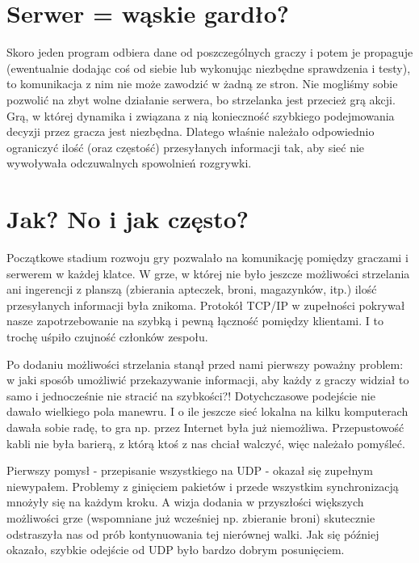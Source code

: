 \documentclass[licencjacka]{pracamgr}
\begin{document}
\section{Serwer = wąskie gardło?}

Skoro jeden program odbiera dane od poszczególnych graczy i potem je propaguje (ewentualnie dodając coś od siebie lub wykonując niezbędne sprawdzenia i testy), to komunikacja z nim nie może zawodzić w żadną ze stron. Nie mogliśmy sobie pozwolić na zbyt wolne działanie serwera, bo strzelanka jest przecież grą akcji. Grą, w której dynamika i związana z nią konieczność szybkiego podejmowania decyzji przez gracza jest niezbędna. Dlatego właśnie należało odpowiednio ograniczyć ilość (oraz częstość) przesyłanych informacji tak, aby sieć nie wywoływała odczuwalnych spowolnień rozgrywki.

\section{Jak? No i jak często?}

Początkowe stadium rozwoju gry pozwalało na komunikację pomiędzy graczami i serwerem w każdej klatce. W grze, w której nie było jeszcze możliwości strzelania ani ingerencji z planszą (zbierania apteczek, broni, magazynków, itp.) ilość przesyłanych informacji była znikoma. Protokół TCP/IP w zupełności pokrywał nasze zapotrzebowanie na szybką i pewną łączność pomiędzy klientami. I to trochę uśpiło czujność członków zespołu.

Po dodaniu możliwości strzelania stanął przed nami pierwszy poważny problem: w jaki sposób umożliwić przekazywanie informacji, aby każdy z graczy widział to samo i jednocześnie nie stracić na szybkości?! Dotychczasowe podejście nie dawało wielkiego pola manewru. I o ile jeszcze sieć lokalna na kilku komputerach dawała sobie radę, to gra np. przez Internet była już niemożliwa. Przepustowość kabli nie była barierą, z którą ktoś z nas chciał walczyć, więc należało pomyśleć.

Pierwszy pomysł - przepisanie wszystkiego na UDP - okazał się zupełnym niewypałem. Problemy z ginięciem pakietów i przede wszystkim synchronizacją mnożyły się na każdym kroku. A wizja dodania w przyszłości większych możliwości grze (wspomniane już wcześniej np. zbieranie broni) skutecznie odstraszyła nas od prób kontynuowania tej nierównej walki. Jak się później okazało, szybkie odejście od UDP było bardzo dobrym posunięciem.
\end{document}
